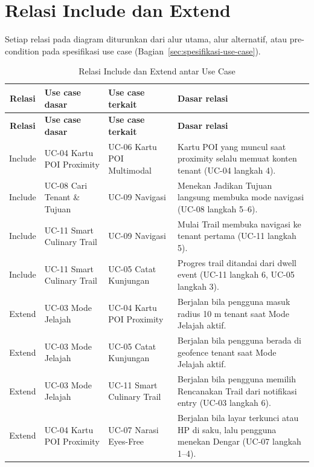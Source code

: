 \section{Relasi Include dan Extend}

Setiap relasi pada diagram diturunkan dari alur utama, alur alternatif, atau pre-condition pada spesifikasi use case (Bagian~\ref{sec:spesifikasi-use-case}).

\begin{longtable}{|C{0.11}|L{0.19}|L{0.19}|L{0.51}|}
\caption{Relasi Include dan Extend antar Use Case}\\
\hline
{}\textbf{Relasi} & \textbf{Use case dasar} & \textbf{Use case terkait} & \textbf{Dasar relasi} \\ \hline
\endfirsthead
\hline
{}\textbf{Relasi} & \textbf{Use case dasar} & \textbf{Use case terkait} & \textbf{Dasar relasi} \\ \hline
\endhead
Include & UC-04 Kartu POI Proximity & UC-06 Kartu POI Multimodal & Kartu POI yang muncul saat proximity selalu memuat konten tenant (UC-04 langkah 4). \\ \hline
Include & UC-08 Cari Tenant \& Tujuan & UC-09 Navigasi & Menekan Jadikan Tujuan langsung membuka mode navigasi (UC-08 langkah 5--6). \\ \hline
Include & UC-11 Smart Culinary Trail & UC-09 Navigasi & Mulai Trail membuka navigasi ke tenant pertama (UC-11 langkah 5). \\ \hline
Include & UC-11 Smart Culinary Trail & UC-05 Catat Kunjungan & Progres trail ditandai dari dwell event (UC-11 langkah 6, UC-05 langkah 3). \\ \hline
Extend & UC-03 Mode Jelajah & UC-04 Kartu POI Proximity & Berjalan bila pengguna masuk radius 10 m tenant saat Mode Jelajah aktif. \\ \hline
Extend & UC-03 Mode Jelajah & UC-05 Catat Kunjungan & Berjalan bila pengguna berada di geofence tenant saat Mode Jelajah aktif. \\ \hline
Extend & UC-03 Mode Jelajah & UC-11 Smart Culinary Trail & Berjalan bila pengguna memilih Rencanakan Trail dari notifikasi entry (UC-03 langkah 6). \\ \hline
Extend & UC-04 Kartu POI Proximity & UC-07 Narasi Eyes-Free & Berjalan bila layar terkunci atau HP di saku, lalu pengguna menekan Dengar (UC-07 langkah 1--4). \\ \hline

\end{longtable}
